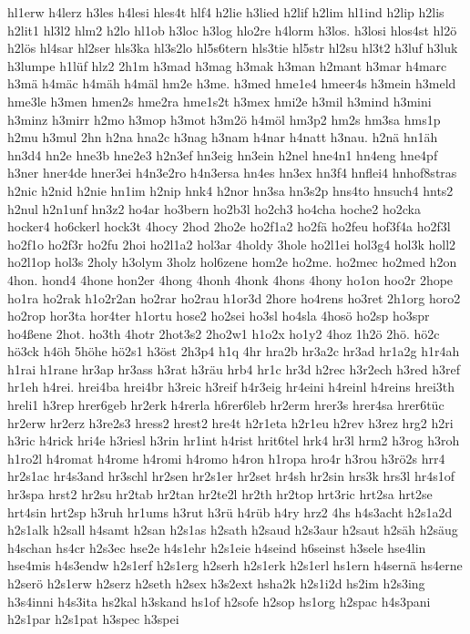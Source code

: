 {hl1erw
h4lerz
h3les
h4lesi
hles4t
hlf4
h2lie
h3lied
h2lif
h2lim
hl1ind
h2lip
h2lis
h2lit1
hl3l2
hlm2
h2lo
hl1ob
h3loc
h3log
hlo2re
h4lorm
h3los.
h3losi
hlos4st
hl2ö
h2lös
hl4sar
hl2ser
hls3ka
hl3s2lo
hl5s6tern
hls3tie
hl5str
hl2su
hl3t2
h3luf
h3luk
h3lumpe
h1lüf
hlz2
2h1m
h3mad
h3mag
h3mak
h3man
h2mant
h3mar
h4marc
h3mä
h4mäc
h4mäh
h4mäl
hm2e
h3me.
h3med
hme1e4
hmeer4s
h3mein
h3meld
hme3le
h3men
hmen2s
hme2ra
hme1s2t
h3mex
hmi2e
h3mil
h3mind
h3mini
h3minz
h3mirr
h2mo
h3mop
h3mot
h3m2ö
h4möl
hm3p2
hm2s
hm3sa
hms1p
h2mu
h3mul
2hn
h2na
hna2c
h3nag
h3nam
h4nar
h4natt
h3nau.
h2nä
hn1äh
hn3d4
hn2e
hne3b
hne2e3
h2n3ef
hn3eig
hn3ein
h2nel
hne4n1
hn4eng
hne4pf
h3ner
hner4de
hner3ei
h4n3e2ro
h4n3ersa
hn4es
hn3ex
hn3f4
hnflei4
hnhof8stras
h2nic
h2nid
h2nie
hn1im
h2nip
hnk4
h2nor
hn3sa
hn3s2p
hns4to
hnsuch4
hnts2
h2nul
h2n1unf
hn3z2
ho4ar
ho3bern
ho2b3l
ho2ch3
ho4cha
hoche2
ho2cka
hocker4
ho6ckerl
hock3t
4hocy
2hod
2ho2e
ho2f1a2
ho2fä
ho2feu
hof3f4a
ho2f3l
ho2f1o
ho2f3r
ho2fu
2hoi
ho2l1a2
hol3ar
4holdy
3hole
ho2l1ei
hol3g4
hol3k
holl2
ho2l1op
hol3s
2holy
h3olym
3holz
hol6zene
hom2e
ho2me.
ho2mec
ho2med
h2on
4hon.
hond4
4hone
hon2er
4hong
4honh
4honk
4hons
4hony
ho1on
hoo2r
2hope
ho1ra
ho2rak
h1o2r2an
ho2rar
ho2rau
h1or3d
2hore
ho4rens
ho3ret
2h1org
horo2
ho2rop
hor3ta
hor4ter
h1ortu
hose2
ho2sei
ho3sl
ho4sla
4hosö
ho2sp
ho3spr
ho4ßene
2hot.
ho3th
4hotr
2hot3s2
2ho2w1
h1o2x
ho1y2
4hoz
1h2ö
2hö.
hö2c
hö3ck
h4öh
5höhe
hö2s1
h3öst
2h3p4
h1q
4hr
hra2b
hr3a2c
hr3ad
hr1a2g
h1r4ah
h1rai
h1rane
hr3ap
hr3ass
h3rat
h3räu
hrb4
hr1c
hr3d
h2rec
h3r2ech
h3red
h3ref
hr1eh
h4rei.
hrei4ba
hrei4br
h3reic
h3reif
h4r3eig
hr4eini
h4reinl
h4reins
hrei3th
hreli1
h3rep
hrer6geb
hr2erk
h4rerla
h6rer6leb
hr2erm
hrer3s
hrer4sa
hrer6tüc
hr2erw
hr2erz
h3re2s3
hress2
hrest2
hre4t
h2r1eta
h2r1eu
h2rev
h3rez
hrg2
h2ri
h3ric
h4rick
hri4e
h3riesl
h3rin
hr1int
h4rist
hrit6tel
hrk4
hr3l
hrm2
h3rog
h3roh
h1ro2l
h4romat
h4rome
h4romi
h4romo
h4ron
h1ropa
hro4r
h3rou
h3rö2s
hrr4
hr2s1ac
hr4s3and
hr3schl
hr2sen
hr2s1er
hr2set
hr4sh
hr2sin
hrs3k
hrs3l
hr4s1of
hr3spa
hrst2
hr2su
hr2tab
hr2tan
hr2te2l
hr2th
hr2top
hrt3ric
hrt2sa
hrt2se
hrt4sin
hrt2sp
h3ruh
hr1ums
h3rut
h3rü
h4rüb
h4ry
hrz2
4hs
h4s3acht
h2s1a2d
h2s1alk
h2sall
h4samt
h2san
h2s1as
h2sath
h2saud
h2s3aur
h2saut
h2säh
h2säug
h4schan
hs4cr
h2s3ec
hse2e
h4s1ehr
h2s1eie
h4seind
h6seinst
h3sele
hse4lin
hse4mis
h4s3endw
h2s1erf
h2s1erg
h2serh
h2s1erk
h2s1erl
hs1ern
h4sernä
hs4erne
h2serö
h2s1erw
h2serz
h2seth
h2sex
h3s2ext
hsha2k
h2s1i2d
hs2im
h2s3ing
h3s4inni
h4s3ita
hs2kal
h3skand
hs1of
h2sofe
h2sop
hs1org
h2spac
h4s3pani
h2s1par
h2s1pat
h3spec
h3spei
}

